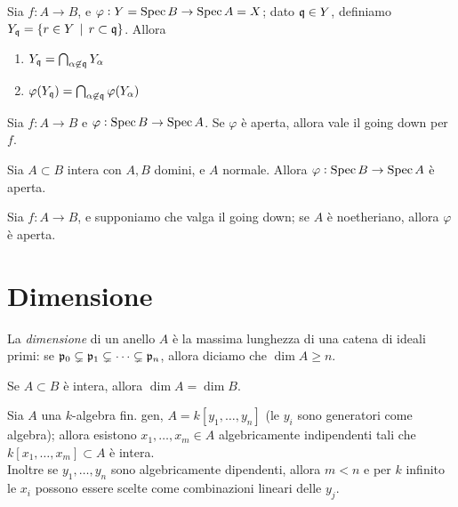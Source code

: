 \begin{lemma}
    Sia $f:A\to B$, e $\varphi:Y=\operatorname{Spec} B\to \operatorname{Spec} A=X$; dato $\mathfrak{q}\in Y$, definiamo $Y_{\mathfrak{q}}=\{ r\in Y \operatorname{\; |\;} r\subset \mathfrak{q} \}$. Allora
    \begin{enumerate}
        \item $Y_{\mathfrak{q}}=\bigcap_{\alpha\not\in \mathfrak{q}} Y_\alpha$
        \item $\varphi(Y_{\mathfrak{q}})=\bigcap_{\alpha\not\in \mathfrak{q}} \varphi(Y_\alpha)$
    \end{enumerate}
\end{lemma}

\begin{theorem}
    Sia $f:A\to B$ e $\varphi:\operatorname{Spec} B\to\operatorname{Spec} A$. Se $\varphi$ è aperta, allora vale il going down per $f$.
\end{theorem}

\begin{theorem}
    Sia $A\subset B$ intera con $A,B$ domini, e $A$ normale. Allora $\varphi:\operatorname{Spec} B\to\operatorname{Spec} A$ è aperta.
\end{theorem}

\begin{proposition}
    Sia $f:A\to B$, e supponiamo che valga il going down; se $A$ è noetheriano, allora $\varphi$ è aperta.
\end{proposition}


\section{Dimensione}

\begin{definition}
    La \emph{dimensione} di un anello $A$ è la massima lunghezza di una catena di ideali primi: se $\mathfrak{p}_0\subsetneq \mathfrak{p}_1\subsetneq\dots\subsetneq\mathfrak{p}_n$, allora diciamo che $\dim A\ge n$.
\end{definition}

\begin{proposition}
    Se $A\subset B$ è intera, allora $\dim A=\dim B$.
\end{proposition}

\begin{theorem}
    Sia $A$ una $k$-algebra fin. gen, $A=k[y_1,\dots,y_n]$ (le $y_i$ sono generatori come algebra); allora esistono $x_1,\dots,x_m\in A$ algebricamente indipendenti tali che $k[x_1,\dots,x_m]\subset A$ è intera.\\
    Inoltre se $y_1,\dots,y_n$ sono algebricamente dipendenti, allora $m<n$ e per $k$ infinito le $x_i$ possono essere scelte come combinazioni lineari delle $y_j$.
\end{theorem}

